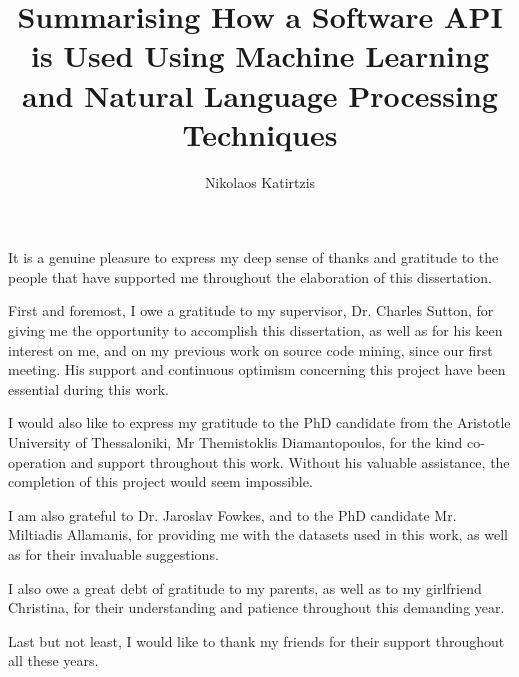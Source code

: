 \documentclass[msc, cs, leftchapter, logo]{infthesis}
\title{Summarising How a Software API is Used Using Machine Learning and Natural Language Processing Techniques}
\author{Nikolaos Katirtzis}
\begin{document}
\begin{preliminary}

\maketitle

\begin{acknowledgements}
It is a genuine pleasure to express my deep sense of thanks and gratitude to the people that have supported me throughout the elaboration of this dissertation.

First and foremost, I owe a gratitude to my supervisor, Dr. Charles Sutton, for giving me the opportunity to accomplish this dissertation, as well as for his keen interest on me, and on my previous work on source code mining, since our first meeting. His support and continuous optimism concerning this project have been essential during this work.

I would also like to express my gratitude to the PhD candidate from the Aristotle University of Thessaloniki, Mr Themistoklis Diamantopoulos, for the kind co-operation and support throughout this work. Without his valuable assistance, the completion of this project would seem impossible.

I am also grateful to Dr. Jaroslav Fowkes, and to the PhD candidate Mr. Miltiadis Allamanis, for providing me with the datasets used in this work, as well as for their invaluable suggestions.

I also owe a great debt of gratitude to my parents, as well as to my girlfriend Christina, for their understanding and patience throughout this demanding year.

Last but not least, I would like to thank my friends for their support throughout all these years.

\end{acknowledgements}

\standarddeclaration

\tableofcontents
\listoffigures
\listoftables
\listofalgorithms

\end{preliminary}










\appendix








\end{document}
